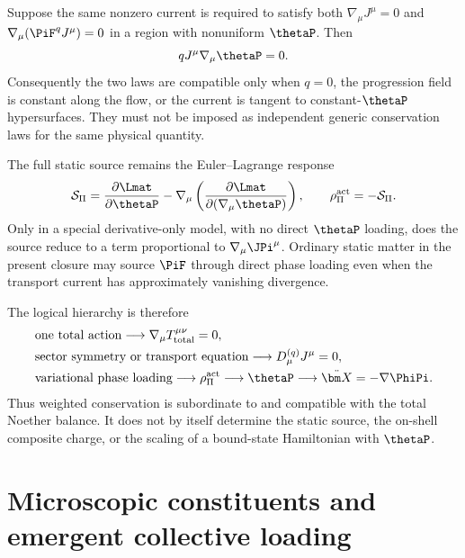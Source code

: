 \documentclass[12pt]{article}
\begin{document}
\begin{proposition}
Suppose the same nonzero current is required to satisfy both \(\nabla_\mu J^\mu=0\) and \(\nabla_\mu(\PiF^qJ^\mu)=0\) in a region with nonuniform \(\thetaP\).  Then
\begin{equation}
    qJ^\mu\nabla_\mu\thetaP=0.
    \label{eq:double-conservation-constraint}
\end{equation}
Consequently the two laws are compatible only when \(q=0\), the progression field is constant along the flow, or the current is tangent to constant-\(\thetaP\) hypersurfaces.  They must not be imposed as independent generic conservation laws for the same physical quantity.
\end{proposition}

The full static source remains the Euler--Lagrange response
\begin{equation}
    \mathcal S_\Pi
    =\frac{\partial\Lmat}{\partial\thetaP}
    -\nabla_\mu\left(
      \frac{\partial\Lmat}{\partial(\nabla_\mu\thetaP)}
    \right),
    \qquad
    \rho_\Pi^{\rm act}=-\mathcal S_\Pi .
    \label{eq:weighted-full-source-repeat}
\end{equation}
Only in a special derivative-only model, with no direct \(\thetaP\) loading, does the source reduce to a term proportional to \(\nabla_\mu\JPi^\mu\).  Ordinary static matter in the present closure may source \(\PiF\) through direct phase loading even when the transport current has approximately vanishing divergence.

The logical hierarchy is therefore
\begin{equation}
\begin{aligned}
    &\text{one total action}
    \longrightarrow \nabla_\mu T_{\rm total}^{\mu\nu}=0,\\
    &\text{sector symmetry or transport equation}
    \longrightarrow D_\mu^{(q)}J^\mu=0,\\
    &\text{variational phase loading}
    \longrightarrow \rho_\Pi^{\rm act}
    \longrightarrow \thetaP
    \longrightarrow \ddot{\bm X}=-\nabla\PhiPi .
\end{aligned}
\label{eq:logic-chain-normalized}
\end{equation}
Thus weighted conservation is subordinate to and compatible with the total Noether balance.  It does not by itself determine the static source, the on-shell composite charge, or the scaling of a bound-state Hamiltonian with \(\thetaP\).
\section{Microscopic constituents and emergent collective loading}
\label{sec:higgs-shared-loading}
\end{document}
